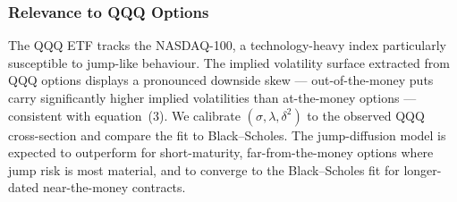 \documentclass[12pt]{article}
\begin{document}
\subsubsection*{Relevance to QQQ Options}

The QQQ ETF tracks the NASDAQ-100, a technology-heavy index particularly susceptible to
jump-like behaviour. The implied volatility surface extracted from QQQ options displays a
pronounced downside skew --- out-of-the-money puts carry significantly higher implied
volatilities than at-the-money options --- consistent with equation~(3). We calibrate
$(\sigma,\lambda,\delta^2)$ to the observed QQQ cross-section and compare the fit to
Black--Scholes. The jump-diffusion model is expected to outperform for short-maturity,
far-from-the-money options where jump risk is most material, and to converge to the
Black--Scholes fit for longer-dated near-the-money contracts.
\end{document}
